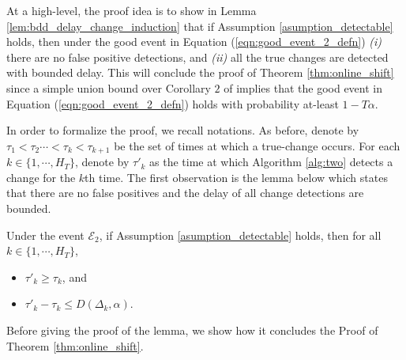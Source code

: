 At a high-level, the proof idea is to show in Lemma \ref{lem:bdd_delay_change_induction} that if Assumption \ref{asumption_detectable} holds, then under the good event in Equation (\ref{eqn:good_event_2_defn}) {\em (i)} there are no false positive detections, and {\em (ii)} all the true changes are detected with bounded delay. This will conclude the proof of Theorem \ref{thm:online_shift} since a simple union bound over Corollary $2$ of \cite{howard2022sequential} implies that the good event in Equation (\ref{eqn:good_event_2_defn}) holds with probability at-least $1-T \alpha$.

In order to formalize the proof, we recall notations. As before, denote by $\tau_1 < \tau_2 \cdots < \tau_k < \tau_{k+1}$ be the set of times at which a true-change occurs. For each $k \in \{1, \cdots, H_T\}$, denote by $\tau'_k$ as the time at which Algorithm \ref{alg:two} detects a change for the $k$th time. The first observation is the lemma below which states that there are no false positives and the delay of all change detections are bounded.



\begin{lemma}
    Under the event $\mathcal{E}_2$, if Assumption \ref{asumption_detectable} holds, then for all $k \in \{1, \cdots, H_T\}$, 
    \begin{itemize}
        \item  $\tau'_k \geq \tau_k$, and
        \item $\tau'_k - \tau_k \leq D(\Delta_k, \alpha)$.
    \end{itemize}
    \label{lem:bdd_delay_change_induction}
\end{lemma}

Before giving the proof of the lemma, we show how it concludes the Proof of Theorem \ref{thm:online_shift}.

